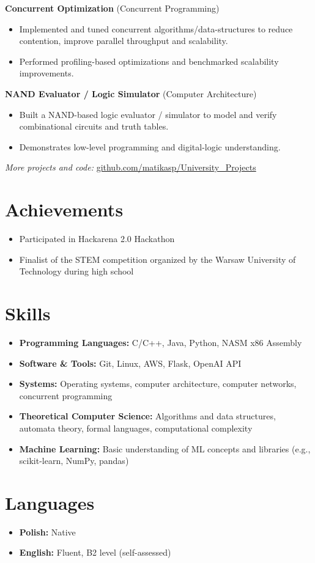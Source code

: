 \documentclass[a4paper,10pt]{article}
\begin{document}
\textbf{Concurrent Optimization} \hfill (Concurrent Programming)
\begin{itemize}[left=0pt, noitemsep]
    \item Implemented and tuned concurrent algorithms/data-structures to reduce contention, improve parallel throughput and scalability.
    \item Performed profiling-based optimizations and benchmarked scalability improvements.
\end{itemize}

\textbf{NAND Evaluator / Logic Simulator} \hfill (Computer Architecture)
\begin{itemize}[left=0pt, noitemsep]
    \item Built a NAND-based logic evaluator / simulator to model and verify combinational circuits and truth tables.
    \item Demonstrates low-level programming and digital-logic understanding.
\end{itemize}

\small\textit{More projects and code:} \href{https://github.com/matikasp/University_Projects}{github.com/matikasp/University\_Projects}
\section*{Achievements}
\begin{itemize}[left=0pt]
    \item Participated in Hackarena 2.0 Hackathon
    \item Finalist of the STEM competition organized by the Warsaw University of Technology during high school
\end{itemize}

\section*{Skills}
\begin{itemize}[left=0pt]
    \item \textbf{Programming Languages:} C/C++, Java, Python, NASM x86 Assembly
    \item \textbf{Software \& Tools:} Git, Linux, AWS, Flask, OpenAI API
    \item \textbf{Systems:} Operating systems, computer architecture, computer networks, concurrent programming
    \item \textbf{Theoretical Computer Science:} Algorithms and data structures, automata theory, formal languages, computational complexity
    \item \textbf{Machine Learning:} Basic understanding of ML concepts and libraries (e.g., scikit-learn, NumPy, pandas)
\end{itemize}

\section*{Languages}
\begin{itemize}[left=0pt]
    \item \textbf{Polish:} Native
    \item \textbf{English:} Fluent, B2 level (self-assessed)
\end{itemize}
\end{document}
